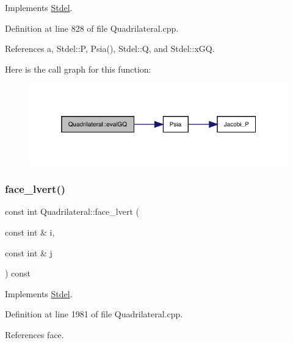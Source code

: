 Implements \hyperlink{classStdel_ae144597c3199b1757a5fbbc255e17baa}{Stdel}.



Definition at line 828 of file Quadrilateral.\+cpp.



References a, Stdel\+::P, Psia(), Stdel\+::Q, and Stdel\+::x\+GQ.

Here is the call graph for this function\+:
\nopagebreak
\begin{figure}[H]
\begin{center}
\leavevmode
\includegraphics[width=319pt]{classQuadrilateral_a329c8c6e8cc339122471f5142818d70e_cgraph}
\end{center}
\end{figure}
\mbox{\label{classQuadrilateral_a1bf6b904ece09fa6e82c70b88118c33f}} 
\subsubsection{\texorpdfstring{face\+\_\+lvert()}{face\_lvert()}}
{\footnotesize\ttfamily const int Quadrilateral\+::face\+\_\+lvert (\begin{DoxyParamCaption}\item[{const int \&}]{i,  }\item[{const int \&}]{j }\end{DoxyParamCaption}) const\hspace{0.3cm}{\ttfamily [virtual]}}



Implements \hyperlink{classStdel_a0df3b2fe6d87c6d0067d07ac2a2d3a32}{Stdel}.



Definition at line 1981 of file Quadrilateral.\+cpp.



References face.

\mbox{\label{classQuadrilateral_a6d2aa65447f4ca5c0957aba5da287a7a}} 
